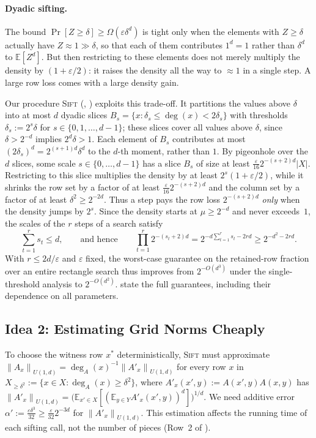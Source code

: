 \documentclass[11pt]{article}
\theoremstyle{definition}
\renewcommand{\label}[1]{}%
\newcommand{\E}{\mathbb{E}}
\newcommand{\norm}[1]{\left\lVert #1 \right\rVert}
\newcommand{\abs}[1]{\left\lvert #1 \right\rvert}
\newcommand{\Sift}{\textnormal{\textsc{Sift}}}
\begin{document}
\paragraph{Dyadic sifting.}
The bound $\Pr[Z \ge \delta] \ge \Omega(\varepsilon \delta^d)$ is tight only when the elements with $Z \ge \delta$ actually have $Z \approx 1 \gg \delta$, so that each of them contributes $1^d = 1$ rather than $\delta^d$ to $\E[Z^d]$. But then restricting to these elements does not merely multiply the density by $(1 + \varepsilon/2)$: it raises the density all the way to $\approx 1$ in a single step. A large row loss comes with a large density gain.

Our procedure \Sift{} (, ) exploits this trade-off. It partitions the values above $\delta$ into at most $d$ dyadic slices $B_s = \{x : \delta_s \le \deg(x) < 2\delta_s\}$ with thresholds $\delta_s := 2^s \delta$ for $s \in \{0, 1, \dots, d-1\}$; these slices cover all values above $\delta$, since $\delta > 2^{-d}$ implies $2^d\delta > 1$. Each element of $B_s$ contributes at most $(2\delta_s)^d = 2^{(s+1)d}\delta^d$ to the $d$-th moment, rather than $1$. By pigeonhole over the $d$ slices, some scale $s \in \{0, \dots, d-1\}$ has a slice $B_s$ of size at least $\frac{\varepsilon}{16} 2^{-(s+2)d}\abs{X}$. Restricting to this slice multiplies the density by at least $2^s(1 + \varepsilon/2)$, while it shrinks the row set by a factor of at least $\frac{\varepsilon}{16} 2^{-(s+2)d}$ and the column set by a factor of at least $\delta^2 \ge 2^{-2d}$. Thus a step pays the row loss $2^{-(s+2)d}$ \emph{only} when the density jumps by $2^s$. Since the density starts at $\mu \ge 2^{-d}$ and never exceeds~$1$, the scales of the $r$ steps of a search satisfy
\[
    \sum_{t=1}^r s_t \le d, \qquad \text{and hence} \qquad \prod_{t=1}^r 2^{-(s_t + 2)d} = 2^{-d\sum_{t=1}^r s_t - 2rd} \ge 2^{-d^2 - 2rd}.
\]
With $r \le 2d/\varepsilon$ and $\varepsilon$ fixed, the worst-case guarantee on the retained-row fraction over an entire rectangle search thus improves from $2^{-O(d^3)}$ under the single-threshold analysis to $2^{-O(d^2)}$.  state the full guarantees, including their dependence on all parameters.

\subsection{Idea 2: Estimating Grid Norms Cheaply}
\label{sec:overview-norm}

To choose the witness row $x^*$ deterministically, \Sift{} must approximate $\norm{A_x}_{U(1, d)} = \deg_A(x)^{-1}\norm{A'_x}_{U(1, d)}$ for every row $x$ in $X_{\ge \delta^2} := \{x \in X : \deg_A(x) \ge \delta^2\}$, where $A'_x(x', y) := A(x', y)A(x, y)$ has $\norm{A'_x}_{U(1, d)} = \big(\E_{x' \in X}[(\E_{y \in Y} A'_x(x', y))^d]\big)^{1/d}$. We need additive error $\alpha' := \frac{\varepsilon \delta^3}{32} \ge \frac{\varepsilon}{32} 2^{-3d}$ for $\norm{A'_x}_{U(1, d)}$. This estimation affects the running time of each sifting call, not the number of pieces (Row~2 of ).
\end{document}
